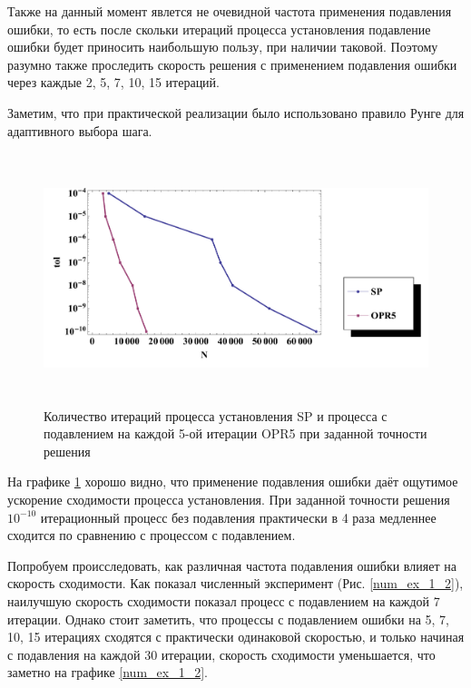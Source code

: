 \documentclass[a4paper,14pt]{extreport}
\begin{document}
  Также на данный момент явлется не очевидной частота применения подавления ошибки, то есть после скольки итераций процесса установления подавление ошибки будет приносить наибольшую пользу, при наличии таковой. Поэтому разумно также проследить скорость решения с применением подавления ошибки через каждые 2, 5, 7, 10, 15 итераций.
  
  Заметим, что при практической реализации было использовано правило Рунге для адаптивного выбора шага.
  
   	 \begin{figure}[H]
	\begin{center}
	\includegraphics[height=7.3cm]{pics/num_ex_1_1.pdf}
	\caption{\small Количество итераций процесса установления SP и процесса с подавлением на каждой 5-ой итерации OPR5 при заданной точности решения}
	\label{SP_OPR5}
	\end{center}
	\end{figure}

На графике \ref{SP_OPR5} хорошо видно, что применение подавления ошибки даёт ощутимое ускорение сходимости процесса установления. При заданной точности решения $10^{-10}$ итерационный процесс без подавления практически в 4 раза медленнее сходится по сравнению с процессом с подавлением.

Попробуем происследовать, как различная частота подавления ошибки влияет на скорость сходимости. Как показал численный эксперимент (Рис. \ref{num_ex_1_2}), наилучшую скорость сходимости показал процесс с подавлением на каждой 7 итерации. Однако стоит заметить, что процессы с подавлением ошибки на 5, 7, 10, 15 итерациях сходятся с практически одинаковой скоростью, и только начиная с подавления на каждой 30 итерации, скорость сходимости уменьшается, что заметно на графике \ref{num_ex_1_2}.
\end{document}
